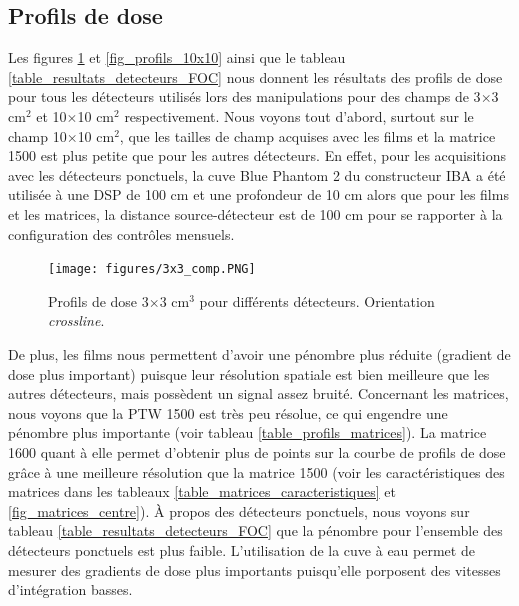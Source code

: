\documentclass{book}
\begin{document}
\subsection{Profils de dose}

Les figures \ref*{fig_profils_3x3}  et \ref*{fig_profils_10x10} ainsi que le tableau \ref*{table_resultats_detecteurs_FOC} nous donnent les résultats des profils de dose pour tous les détecteurs utilisés lors des manipulations pour des champs de 3$\times$3 cm$^2$  et 10$\times$10 cm$^2$ respectivement. Nous voyons tout d'abord, surtout sur le champ 10$\times$10 cm$^2$, que les tailles de champ acquises avec les films et la matrice 1500 est plus petite que pour les autres détecteurs. En effet, pour les acquisitions avec les détecteurs ponctuels, la cuve Blue Phantom 2 du constructeur IBA a été utilisée à une DSP de 100 cm et une profondeur de 10 cm alors que pour les films et les matrices, la distance source-détecteur est de 100 cm pour se rapporter à la configuration des contrôles mensuels.

\begin{figure}[h]
  \centering
  \texttt{[image: figures/3x3\_comp.PNG]}
  \caption{Profils de dose 3$\times$3 cm$^3$ pour différents détecteurs. Orientation \textit{crossline}.}
  \label{fig_profils_3x3}
\end{figure}

De plus, les films nous permettent d'avoir une pénombre plus réduite (gradient de dose plus important) puisque leur résolution spatiale est bien meilleure que les autres détecteurs, mais possèdent un signal assez bruité. Concernant les matrices, nous voyons que la PTW 1500 est très peu résolue, ce qui engendre une pénombre plus importante (voir tableau \ref*{table_profils_matrices}). La matrice 1600 quant à elle permet d'obtenir plus de points sur la courbe de profils de dose grâce à une meilleure résolution que la matrice 1500 (voir les caractéristiques des matrices dans les tableaux \ref*{table_matrices_caracteristiques} et \ref*{fig_matrices_centre}). À propos des détecteurs ponctuels, nous voyons sur tableau \ref*{table_resultats_detecteurs_FOC} que la pénombre pour l'ensemble des détecteurs ponctuels est plus faible. L'utilisation de la cuve à eau permet de mesurer des gradients de dose plus importants puisqu'elle porposent des vitesses d'intégration basses.
\end{document}
